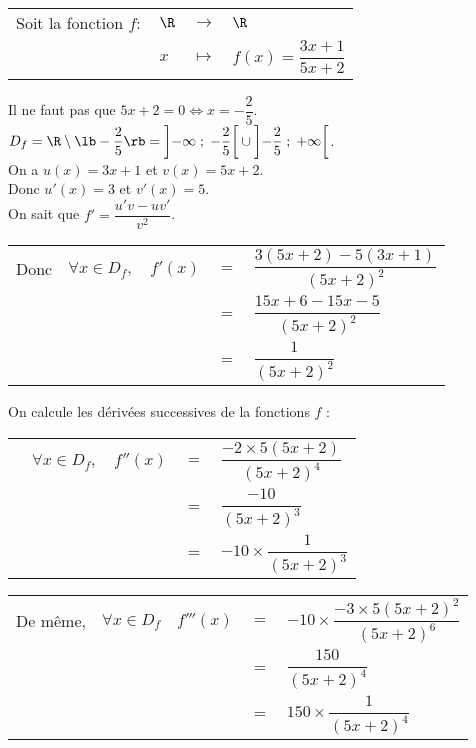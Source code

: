 \begin{tabular}{llll}
Soit la fonction $f :$ & $\R$ & $\longrightarrow$ & $\R$ \\
& $x$ & $\longmapsto$ & $f(x) = \dfrac{3x + 1}{5x + 2}$ \\
\end{tabular}

\vspace*{.3cm}

Il ne faut pas que $5x +2 = 0 \Longleftrightarrow x= -\dfrac{2}{5}$. \\

$D_f = \R \setminus \lb -\dfrac{2}{5} \rb = \left]-\infty \; ; \; -\dfrac{2}{5}\right[\cup\left]-\dfrac{2}{5} \; ; \; +\infty\right[$. \\

On a $u(x) = 3x + 1$ et $v(x) = 5x +2$. \\
Donc $u'(x) = 3$ et $v'(x) = 5$. \\

On sait que $f' = \dfrac{u'v - uv'}{v^2}$.

\begin{tabular}{lllll}
Donc & $\forall x \in D_f,$ & $ f'(x)$ & $ = $ & $ \dfrac{3\left(5x +2\right)-5\left(3x +1\right)}{\left(5x+2\right)^2}$ \vspace*{.3cm} \\
& & & $=$ & $\dfrac{15x + 6 - 15x - 5}{\left(5x+2\right)^2}$ \vspace*{.3cm} \\
& & & $=$ & $\dfrac{1}{\left(5x+2\right)^2}$ \vspace*{.3cm} \\
\end{tabular}

On calcule les dérivées successives de la fonctions $f$ : \\

\begin{tabular}{lllll}
& $\forall x \in D_f,$ & $f''(x)$ & $=$ & $\dfrac{-2 \times 5\left(5x + 2\right)}{\left(5x+2\right)^4}$ \vspace*{.3cm} \\
& & & $=$ & $\dfrac{-10}{\left(5x+2\right)^3}$ \vspace*{.3cm} \\
& & & $=$ & $-10 \times \dfrac{1}{\left(5x +2\right)^3}$ \vspace*{.3cm} \\
\end{tabular}

\begin{tabular}{lllll}
De même, & $\forall x \in D_f$ & $f'''(x)$ & $=$ & $-10 \times \dfrac{-3 \times 5\left(5x+2\right)^2}{\left(5x+2\right)^6}$ \vspace*{.3cm} \\
& & & $=$ & $\dfrac{150}{\left(5x+2\right)^4}$ \vspace*{.3cm} \\
& & & $=$ & $150 \times \dfrac{1}{\left(5x+2\right)^4}$ \vspace*{.3cm} \\
\end{tabular}


